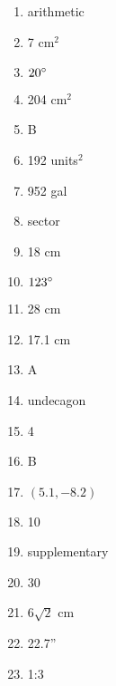\documentclass[../uilmath.tex]{subfiles}
\begin{document}
\begin{enumerate}[label=\bfseries\arabic*.]
    \item %
    arithmetic

    \item %
    7 cm$^2$

    \item %
    $20\degree$

    \item %
    204 cm$^2$

    \item %
    B 

    \item %
    192 units$^2$

    \item %
    952 gal 

    \item %
    sector 

    \item %
    18 cm

    \item %
    $123\degree$

    \item %
    28 cm 

    \item %
    17.1 cm 

    \item %
    A 

    \item %
    undecagon 

    \item %
    4

    \item %
    B 

    \item %
    $(5.1,-8.2)$

    \item %
    10

    \item %
    supplementary

    \item %
    30

    \item %
    $6\sqrt{2}$ cm 

    \item %
    22.7''

    \item %
    1:3


\end{enumerate}
\end{document}

